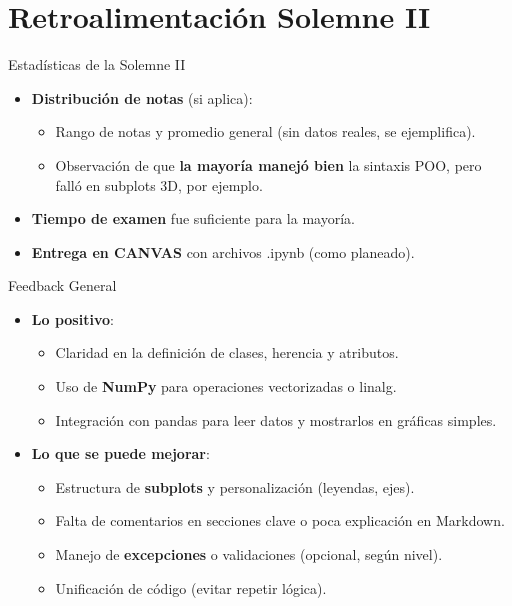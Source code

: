 \documentclass[10pt]{beamer}
\begin{document}
\section{Retroalimentación Solemne II}

\begin{frame}{Estadísticas de la Solemne II}
  \begin{itemize}
    \item \textbf{Distribución de notas} (si aplica):
      \begin{itemize}
        \item Rango de notas y promedio general (sin datos reales, se ejemplifica).
        \item Observación de que \textbf{la mayoría manejó bien} la sintaxis POO, pero falló en subplots 3D, por ejemplo.
      \end{itemize}
    \item \textbf{Tiempo de examen} fue suficiente para la mayoría.
    \item \textbf{Entrega en CANVAS} con archivos .ipynb (como planeado).
  \end{itemize}
\end{frame}

\begin{frame}{Feedback General}
  \begin{itemize}
    \item \textbf{Lo positivo}:
      \begin{itemize}
        \item Claridad en la definición de clases, herencia y atributos.
        \item Uso de \textbf{NumPy} para operaciones vectorizadas o linalg.
        \item Integración con pandas para leer datos y mostrarlos en gráficas simples.
      \end{itemize}
    \item \textbf{Lo que se puede mejorar}:
      \begin{itemize}
        \item Estructura de \textbf{subplots} y personalización (leyendas, ejes).
        \item Falta de comentarios en secciones clave o poca explicación en Markdown.
        \item Manejo de \textbf{excepciones} o validaciones (opcional, según nivel).
        \item Unificación de código (evitar repetir lógica).
      \end{itemize}
  \end{itemize}
\end{frame}
\end{document}
